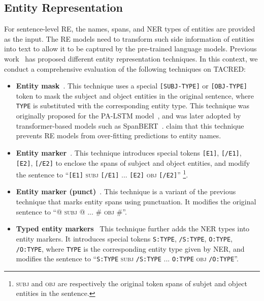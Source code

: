 \documentclass[11pt,a4paper]{article}
\begin{document}
\subsection{Entity Representation}
\label{sec:entity_representation}
For sentence-level RE, the names, spans, and NER types of entities are provided as the input.
The RE models need to transform such side information of entities into text to allow it to be captured by the pre-trained language models.
Previous work~\cite{zhang-etal-2017-position,baldini-soares-etal-2019-matching,wang2020k} has proposed different entity representation techniques.
In this context, we conduct a comprehensive evaluation of the following techniques on TACRED:
\begin{itemize}[leftmargin=1em]
    \setlength\itemsep{0em}
    \item \textbf{Entity mask}~\cite{zhang-etal-2017-position}. This technique uses a special \texttt{[SUBJ-TYPE]} or \texttt{[OBJ-TYPE]} token to mask the subject and object entities in the original sentence, where \texttt{TYPE} is substituted with the corresponding entity type.
    This technique was originally proposed for the PA-LSTM model~\cite{zhang-etal-2017-position}, and was later adopted by transformer-based models such as SpanBERT~\cite{joshi-etal-2020-spanbert}.
    \citet{zhang-etal-2017-position} claim that this technique prevents RE models from over-fitting predictions to entity names.
    \item \textbf{Entity marker}~\cite{zhang-etal-2019-ernie,baldini-soares-etal-2019-matching}. This technique introduces special tokens \texttt{[E1]}, \texttt{[/E1]}, \texttt{[E2]}, \texttt{[/E2]} to enclose the spans of subject and object entities, and modify the sentence to ``\texttt{[E1]} \textsc{subj} \texttt{[/E1]} ... \texttt{[E2]} \textsc{obj} \texttt{[/E2]}'' \footnote{\textsc{subj} and \textsc{obj} are respectively the original token spans of subjet and object entities in the sentence.}.
    \item \textbf{Entity marker (punct)}~\cite{wang2020k,zhou2021atlop}. This technique is a variant of the previous technique that marks entity spans using punctuation.
    It modifies the original sentence to ``@ \textsc{subj} @ ... \# \textsc{obj} \#''.
    \item \textbf{Typed entity markers}~\cite{zhong2020frustratingly} This technique further adds the NER types into entity markers.
    It introduces special tokens \texttt{S:TYPE}, \texttt{/S:TYPE}, \texttt{O:TYPE}, \texttt{/O:TYPE}, where \texttt{TYPE} is the corresponding entity type given by NER, and modifies the sentence to ``\texttt{S:TYPE} \textsc{subj} \texttt{/S:TYPE} ... \texttt{O:TYPE} \textsc{obj} \texttt{/O:TYPE}''.

\end{itemize}
\end{document}
